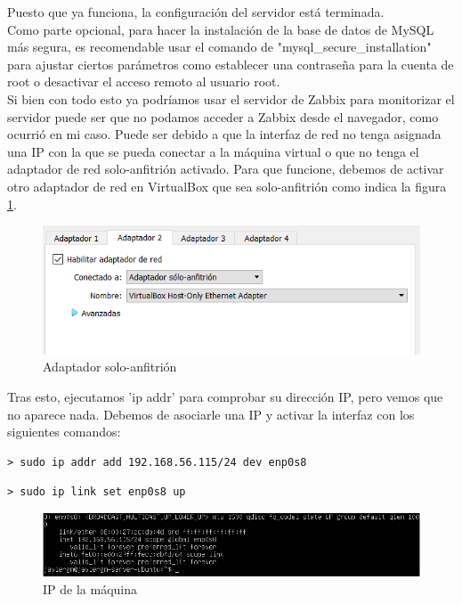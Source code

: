 Puesto que ya funciona, la configuración del servidor está terminada.\\

Como parte opcional, para hacer la instalación de la base de datos de MySQL más segura, es recomendable usar el comando de "mysql\_secure\_installation" para ajustar ciertos parámetros como establecer una contraseña para la cuenta de root o desactivar el acceso remoto al usuario root.\\

Si bien con todo esto ya podríamos usar el servidor de Zabbix para monitorizar el servidor puede ser que no podamos acceder a Zabbix desde el navegador, como ocurrió en mi caso. Puede ser debido a que la interfaz de red no tenga asignada una IP con la que se pueda conectar a la máquina virtual o que no tenga el adaptador de red solo-anfitrión activado. Para que funcione, debemos de activar otro adaptador de red en VirtualBox que sea solo-anfitrión como indica la figura \ref{fig:adaptador}.\\

\begin{figure}[H]
  \centering
  \includegraphics{Captura10}
  \caption{Adaptador solo-anfitrión}
  \label{fig:adaptador}
\end{figure}

Tras esto, ejecutamos 'ip addr' para comprobar su dirección IP, pero vemos que no aparece nada. Debemos de asociarle una IP y activar la interfaz con los siguientes comandos:

\begin{lstlisting}
> sudo ip addr add 192.168.56.115/24 dev enp0s8
\end{lstlisting}

\begin{lstlisting}
> sudo ip link set enp0s8 up
\end{lstlisting}

\begin{figure}[H]
  \centering
  \includegraphics[scale=0.8]{Captura11}
  \caption{IP de la máquina}
  \label{fig:ip}
\end{figure}

